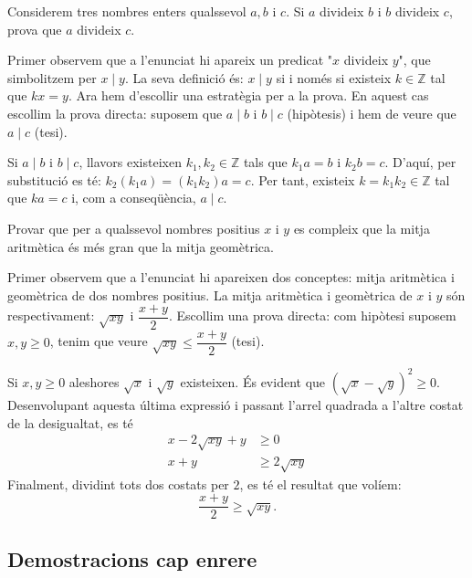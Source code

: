\begin{exemple}
Considerem tres nombres enters qualssevol $a,b$ i $c$. Si $a$ divideix $b$ i
$b$ divideix $c$, prova que $a$ divideix $c$.
\end{exemple}

\begin{solucio}
Primer observem que a l'enunciat hi apareix un predicat "$x$ divideix $y$",
que simbolitzem per $x\mid y$. La seva definició és: $x\mid y$ si i només si existeix $k\in\mathbb{Z}$ tal que $kx=y$. Ara hem d'escollir una estratègia per a la prova. En aquest cas escollim la
prova directa: suposem que $a\mid b$ i $b\mid c$ (hipòtesis) i hem de
veure que $a\mid c$ (tesi).

Si $a\mid b$ i $b\mid c$, llavors existeixen $k_{1},k_{2}\in\mathbb{Z}$ tals
que $k_{1}a=b$ i $k_{2}b=c$. D'aquí, per substitució es té: $k_{2}\left( k_{1}a\right) =\left( k_{1}k_{2}\right) a=c$. Per tant, existeix
$k=k_{1}k_{2}\in\mathbb{Z}$ tal que $ka=c$ i, com a conseqüència, $a\mid c$.
\end{solucio}

\begin{exemple}
Provar que per a qualssevol nombres positius $x$ i $y$ es compleix que la
mitja aritmètica és més gran que la mitja geomètrica.
\end{exemple}

\begin{solucio}
Primer observem que a l'enunciat hi apareixen dos conceptes: mitja aritmètica i geomètrica de dos nombres positius. La mitja aritmètica i geomètrica de $x$ i $y$ són respectivament: $\sqrt{xy}$ i $\dfrac{x+y}{2}
$. Escollim una prova directa: com hipòtesi suposem $x,y\geq0$, tenim
que veure $\sqrt{xy}\leq\dfrac{x+y}{2}$ (tesi).

Si $x,y\geq0$ aleshores $\sqrt{x}$ i $\sqrt{y}$ existeixen. És evident
que $(\sqrt{x}-\sqrt{y})^{2}\geq0$. Desenvolupant aquesta última expressió i passant l'arrel quadrada a l'altre costat de la desigualtat, es té\begin{align*}
x-2\sqrt{xy}+y & \geq0 \\
x+y & \geq2\sqrt{xy}
\end{align*}
Finalment, dividint tots dos costats per $2$, es té el resultat que
volíem:\begin{equation*}
\frac{x+y}{2}\geq\sqrt{xy}\text{.}
\end{equation*}
\end{solucio}

\subsection{Demostracions cap enrere}

